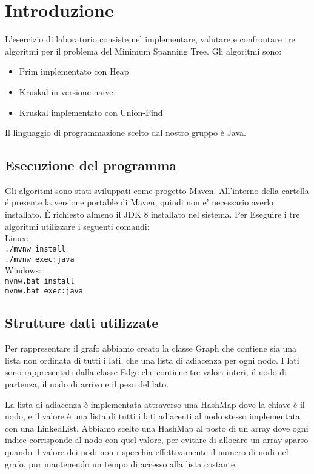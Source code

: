 \section{Introduzione}

L'esercizio di laboratorio consiste nel implementare, valutare e confrontare tre algoritmi per il problema del Minimum Spanning Tree. Gli algoritmi sono:
\begin{itemize}
	\item Prim implementato con Heap
	\item Kruskal in versione naive
	\item Kruskal implementato con Union-Find
\end{itemize}
Il linguaggio di programmazione scelto dal nostro gruppo è Java.

\subsection{Esecuzione del programma}
Gli algoritmi sono stati sviluppati come progetto Maven. All'interno della cartella \'e presente la versione portable di Maven, quindi non e' necessario averlo installato. \'E
richiesto almeno il JDK 8 installato nel sistema.
Per Eseguire i tre algoritmi utilizzare i seguenti comandi:\\
Linux:\\
\indent \texttt{./mvnw install}\\
\indent \texttt{./mvnw exec:java}\\
Windows:\\
\indent \texttt{mvnw.bat install}\\
\indent \texttt{mvnw.bat exec:java}
\subsection{Strutture dati utilizzate}

Per rappresentare il grafo abbiamo creato la classe Graph che contiene sia una lista non ordinata di tutti i lati, che una lista di adiacenza per ogni nodo.
I lati sono rappresentati dalla classe Edge che contiene tre valori interi, il nodo di partenza, il nodo di arrivo e il peso del lato.

La lista di adiacenza è implementata attraverso una HashMap dove la chiave è il nodo, e il valore è una lista di tutti i lati adiacenti al nodo stesso implementata con una LinkedList. Abbiamo scelto una HashMap al posto di un array dove ogni indice corrisponde al nodo con quel valore, per evitare di allocare un array sparso quando il valore dei nodi non rispecchia effettivamente il numero di nodi nel grafo, pur mantenendo un tempo di accesso alla lista costante.


